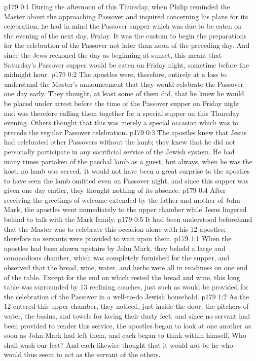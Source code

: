 \author{Midwayer Commission}
\vs p179 0:1 During the afternoon of this Thursday, when Philip reminded the Master about the approaching Passover and inquired concerning his plans for its celebration, he had in mind the Passover supper which was due to be eaten on the evening of the next day, Friday. It was the custom to begin the preparations for the celebration of the Passover not later than noon of the preceding day. And since the Jews reckoned the day as beginning at sunset, this meant that Saturday’s Passover supper would be eaten on Friday night, sometime before the midnight hour.
\vs p179 0:2 The apostles were, therefore, entirely at a loss to understand the Master’s announcement that they would celebrate the Passover one day early. They thought, at least some of them did, that he knew he would be placed under arrest before the time of the Passover supper on Friday night and was therefore calling them together for a special supper on this Thursday evening. Others thought that this was merely a special occasion which was to precede the regular Passover celebration.
\vs p179 0:3 The apostles knew that Jesus had celebrated other Passovers without the lamb; they knew that he did not personally participate in any sacrificial service of the Jewish system. He had many times partaken of the paschal lamb as a guest, but always, when he was the host, no lamb was served. It would not have been a great surprise to the apostles to have seen the lamb omitted even on Passover night, and since this supper was given one day earlier, they thought nothing of its absence.
\vs p179 0:4 After receiving the greetings of welcome extended by the father and mother of John Mark, the apostles went immediately to the upper chamber while Jesus lingered behind to talk with the Mark family.
\vs p179 0:5 It had been understood beforehand that the Master was to celebrate this occasion alone with his 12 apostles; therefore no servants were provided to wait upon them.
\vs p179 1:1 When the apostles had been shown upstairs by John Mark, they beheld a large and commodious chamber, which was completely furnished for the supper, and observed that the bread, wine, water, and herbs were all in readiness on one end of the table. Except for the end on which rested the bread and wine, this long table was surrounded by 13 reclining couches, just such as would be provided for the celebration of the Passover in a well\hyp{}to\hyp{}do Jewish household.
\vs p179 1:2 As the 12 entered this upper chamber, they noticed, just inside the door, the pitchers of water, the basins, and towels for laving their dusty feet; and since no servant had been provided to render this service, the apostles began to look at one another as soon as John Mark had left them, and each began to think within himself, Who shall wash our feet? And each likewise thought that it would not be he who would thus seem to act as the servant of the others.
